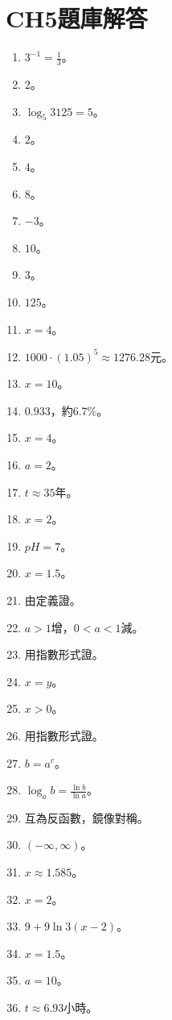 \section{CH5題庫解答}
\begin{enumerate}[label=\arabic*.]
    \item $3^{-1} = \frac{1}{3}$。
    \item $2$。
    \item $\log_5 3125 = 5$。
    \item $2$。
    \item $4$。
    \item $8$。
    \item $-3$。
    \item $10$。
    \item $3$。
    \item $125$。
    \item $x = 4$。
    \item $1000 \cdot (1.05)^5 \approx 1276.28$元。
    \item $x = 10$。
    \item $0.933$，約6.7\%。
    \item $x = 4$。
    \item $a = 2$。
    \item $t \approx 35$年。
    \item $x = 2$。
    \item $pH = 7$。
    \item $x = 1.5$。
    \item 由定義證。
    \item $a > 1$增，$0 < a < 1$減。
    \item 用指數形式證。
    \item $x = y$。
    \item $x > 0$。
    \item 用指數形式證。
    \item $b = a^c$。
    \item $\log_a b = \frac{\ln b}{\ln a}$。
    \item 互為反函數，鏡像對稱。
    \item $(-\infty, \infty)$。
    \item $x \approx 1.585$。
    \item $x = 2$。
    \item $9 + 9 \ln 3 (x - 2)$。
    \item $x = 1.5$。
    \item $a = 10$。
    \item $t \approx 6.93$小時。

\end{enumerate}
